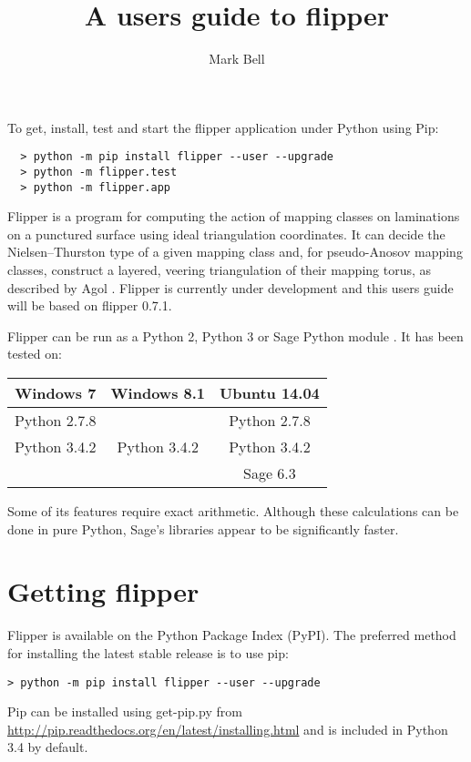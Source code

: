 \documentclass[a4paper]{article}
\title{A users guide to flipper}
\author{Mark Bell}
\begin{document}
\maketitle

\begin{center}
\begin{minipage}{0.8\linewidth}
\begin{framed}
  To get, install, test and start the flipper application under Python using Pip:
  \begin{lstlisting}
  > python -m pip install flipper --user --upgrade
  > python -m flipper.test
  > python -m flipper.app
  \end{lstlisting}
\end{framed}
\end{minipage}
\end{center}

Flipper is a program for computing the action of mapping classes on laminations on a punctured surface using ideal triangulation coordinates. It can decide the Nielsen--Thurston type of a given mapping class and, for pseudo-Anosov mapping classes, construct a layered, veering triangulation of their mapping torus, as described by Agol \cite{Agol}. Flipper is currently under development and this users guide will be based on flipper 0.7.1.


Flipper can be run as a Python 2, Python 3 or Sage Python module \cite{sage}. It has been tested on:

\begin{center}
\begin{tabular}{c|c|c}
Windows 7 & Windows 8.1 & Ubuntu 14.04 \\
\hline
Python 2.7.8 & & Python 2.7.8 \\
Python 3.4.2 & Python 3.4.2 & Python 3.4.2 \\
 & & Sage 6.3 \\
\end{tabular}
\end{center}

Some of its features require exact arithmetic. Although these calculations can be done in pure Python, Sage's libraries appear to be significantly faster.

\section{Getting flipper}

Flipper is available on the Python Package Index (PyPI). The preferred method for installing the latest stable release is to use pip:
\begin{lstlisting}
> python -m pip install flipper --user --upgrade
\end{lstlisting}
Pip can be installed using get-pip.py from \url{http://pip.readthedocs.org/en/latest/installing.html} and is included in Python 3.4 by default.
\end{document}
